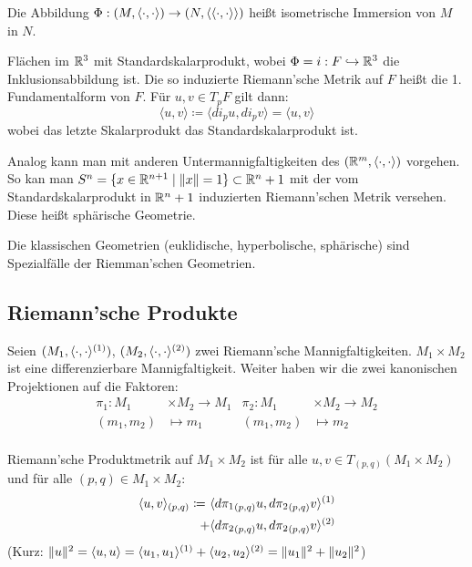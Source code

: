 \documentclass[a4paper,twoside,DIV15,BCOR12mm]{scrbook}
\renewcommand{\da}{\coloneqq}
\begin{document}
Die Abbildung $\Phi: (M,\langle\cdot,\cdot\rangle) \to (N,\langle\langle\cdot,\cdot\rangle\rangle)$ heißt isometrische Immersion von $M$ in $N$.

\begin{beispiel}
Flächen im $\mathbb{R}^3$ mit Standardskalarprodukt, wobei $\Phi=i: F \hookrightarrow \mathbb{R}^3$ die Inklusionsabbildung ist. Die so induzierte Riemann’sche Metrik auf $F$ heißt die 1. Fundamentalform von $F$. Für $u,v \in T_pF$ gilt dann:
\[
\langle u,v\rangle \da \langle di_pu, di_pv\rangle = \langle u, v\rangle
\]
wobei das letzte Skalarprodukt das Standardskalarprodukt ist.
\end{beispiel}

Analog kann man mit anderen Untermannigfaltigkeiten des $(\mathbb{R}^m,\langle\cdot,\cdot\rangle)$ vorgehen. So kan man $S^n = \{x\in\mathbb{R}^{n+1}\mid \|x\|=1\}\subset \mathbb{R}^n+1$ mit der vom Standardskalarprodukt in $\mathbb{R}^n+1$ induzierten Riemann’schen Metrik versehen. Diese heißt sphärische Geometrie.

\begin{bemerkung}
Die klassischen Geometrien (euklidische, hyperbolische, sphärische) sind Spezialfälle der Riemman’schen Geometrien.
\end{bemerkung}

\subsection{Riemann’sche Produkte}
Seien $(M_1, \langle\cdot,\cdot\rangle^{(1)})$, $(M_2, \langle\cdot,\cdot\rangle^{(2)})$ zwei Riemann’sche Mannigfaltigkeiten. $M_1\times M_2$ ist eine differenzierbare Mannigfaltigkeit. Weiter haben wir die zwei kanonischen Projektionen auf die Faktoren:
\begin{align*}
\pi_1: M_1&\times M_2 \to M_1 &
\pi_2: M_1&\times M_2 \to M_2 \\
(m_1,m_2) &\mapsto m_1 &
(m_1,m_2) &\mapsto m_2 \\
\end{align*}

\begin{definition}
Riemann’sche Produktmetrik auf $M_1\times M_2$ ist für alle $u,v\in T_{(p,q)}(M_1\times M_2)$ und für alle $(p,q)\in M_1\times M_2$:
\begin{align*}
\ksp uv_{(p,q)} \da \ & \ksp {d{\pi_1}_{(p,q)} u}{ d{\pi_2}_{(p,q)}v}^{(1)} \\
+ &\ksp {d{\pi_2}_{(p,q)} u}{ d{\pi_2}_{(p,q)}v}^{(2)}
\end{align*}
(Kurz: $\|u\|^2 = \langle u,u\rangle = \langle u_1,u_1\rangle^{(1)} + \langle u_2,u_2\rangle^{(2)} = \|u_1\|^2 + \|u_2\|^2$)
\end{definition}
\end{document}
